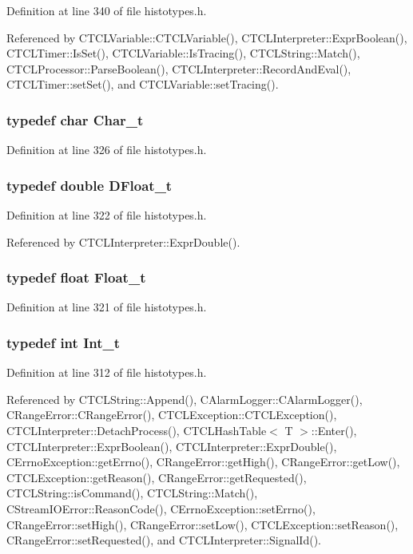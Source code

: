 Definition at line 340 of file histotypes.h.

Referenced by CTCLVariable::CTCLVariable(), CTCLInterpreter::Expr\-Boolean(), CTCLTimer::Is\-Set(), CTCLVariable::Is\-Tracing(), CTCLString::Match(), CTCLProcessor::Parse\-Boolean(), CTCLInterpreter::Record\-And\-Eval(), CTCLTimer::set\-Set(), and CTCLVariable::set\-Tracing().
\subsubsection{\setlength{\rightskip}{0pt plus 5cm}typedef char Char\_\-t}\label{histotypes_8h_a9}




Definition at line 326 of file histotypes.h.
\subsubsection{\setlength{\rightskip}{0pt plus 5cm}typedef double DFloat\_\-t}\label{histotypes_8h_a8}




Definition at line 322 of file histotypes.h.

Referenced by CTCLInterpreter::Expr\-Double().
\subsubsection{\setlength{\rightskip}{0pt plus 5cm}typedef float Float\_\-t}\label{histotypes_8h_a7}




Definition at line 321 of file histotypes.h.
\subsubsection{\setlength{\rightskip}{0pt plus 5cm}typedef int Int\_\-t}\label{histotypes_8h_a1}




Definition at line 312 of file histotypes.h.

Referenced by CTCLString::Append(), CAlarm\-Logger::CAlarm\-Logger(), CRange\-Error::CRange\-Error(), CTCLException::CTCLException(), CTCLInterpreter::Detach\-Process(), CTCLHash\-Table$<$ T $>$::Enter(), CTCLInterpreter::Expr\-Boolean(), CTCLInterpreter::Expr\-Double(), CErrno\-Exception::get\-Errno(), CRange\-Error::get\-High(), CRange\-Error::get\-Low(), CTCLException::get\-Reason(), CRange\-Error::get\-Requested(), CTCLString::is\-Command(), CTCLString::Match(), CStream\-IOError::Reason\-Code(), CErrno\-Exception::set\-Errno(), CRange\-Error::set\-High(), CRange\-Error::set\-Low(), CTCLException::set\-Reason(), CRange\-Error::set\-Requested(), and CTCLInterpreter::Signal\-Id().
